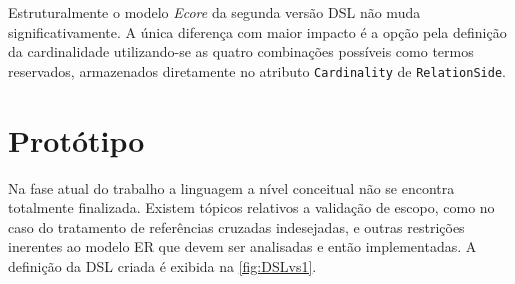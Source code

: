 
Estruturalmente o modelo \textit{Ecore} da segunda versão \ac{DSL} não muda significativamente.%
A única diferença com maior impacto é a opção pela definição da cardinalidade utilizando-se as quatro combinações possíveis como termos reservados, armazenados diretamente no atributo \texttt{Cardinality} de \texttt{RelationSide}.

\section{Protótipo} \label{sec:protDSL}


Na fase atual do trabalho a linguagem a nível conceitual não se encontra totalmente finalizada. 
Existem tópicos relativos a validação de escopo, como no caso do tratamento de referências cruzadas indesejadas, e outras restrições inerentes ao modelo \ac{ER} que devem ser analisadas e então implementadas. 
A definição da \ac{DSL} criada é exibida na \autoref{fig:DSLvs1}.

